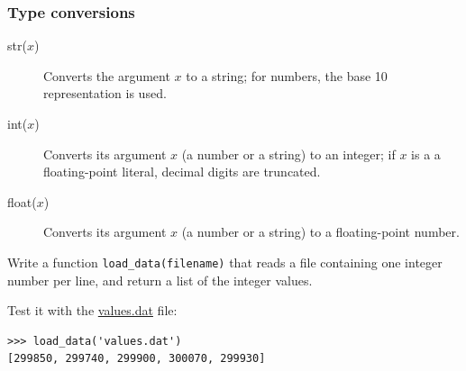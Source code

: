 \documentclass[english,serif,mathserif,xcolor=pdftex,dvipsnames,table]{beamer}
\begin{document}
\begin{frame}[fragile,label=typeconv]
  \frametitle{Type conversions}
  \begin{description}
  \item[str($x$)] Converts the argument $x$ to a string; for numbers,
    the base 10 representation is used.
  \item[int($x$)] Converts its argument $x$ (a number or a string) to an integer;
    if $x$ is a a floating-point literal, decimal digits are truncated.
  \item[float($x$)] Converts its argument $x$ (a number or a string) to a
    floating-point number.
  \end{description}
\end{frame}


\begin{frame}[fragile]


  \begin{exercise*}[9]
    Write a function \lstinline|load_data(filename)| that reads a file
    containing one integer number per line, and return a list of the
    integer values.

    \+
    Test it with the
    \href{https://raw.github.com/gc3-uzh-ch/python-course/master/values.dat}{values.dat}
    file:
\begin{lstlisting}
>>> load_data('values.dat')
[299850, 299740, 299900, 300070, 299930]
\end{lstlisting}
  \end{exercise*}
\end{frame}
\end{document}
